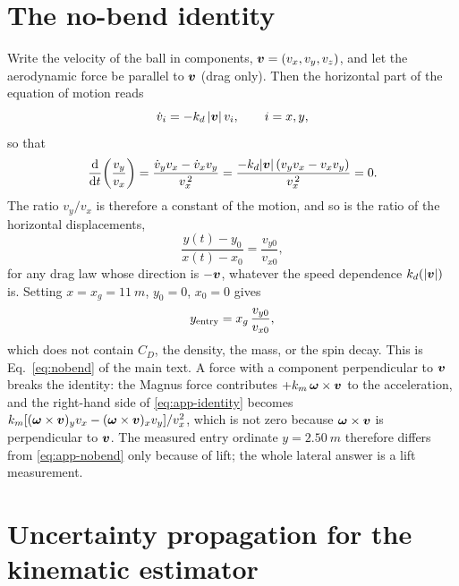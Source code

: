\appendix

\section{The no-bend identity}
\label{app:nobend}

Write the velocity of the ball in components, $\bm{v}=(v_x,v_y,v_z)$, and
let the aerodynamic force be parallel to $\bm{v}$ (drag only). Then the
horizontal part of the equation of motion reads
\begin{equation}
  \dot v_i = -k_d\,|\bm{v}|\,v_i, \qquad i=x,y ,
  \label{eq:app-drag}
\end{equation}
so that
\begin{equation}
  \frac{\mathrm{d}}{\mathrm{d} t}\!\left(\frac{v_y}{v_x}\right)
  = \frac{\dot v_y v_x - \dot v_x v_y}{v_x^{\,2}}
  = \frac{-k_d|\bm{v}|\,(v_y v_x - v_x v_y)}{v_x^{\,2}} = 0 .
  \label{eq:app-identity}
\end{equation}
The ratio $v_y/v_x$ is therefore a constant of the motion, and so is the
ratio of the horizontal displacements,
\begin{equation}
  \frac{y(t)-y_0}{x(t)-x_0} = \frac{v_{y0}}{v_{x0}} ,
  \label{eq:app-ratio}
\end{equation}
for any drag law whose direction is $-\bm{v}$, whatever the speed
dependence $k_d(|\bm{v}|)$ is. Setting $x=x_g=\SI{11}{m}$,
$y_0=0$, $x_0=0$ gives
\begin{equation}
  y_{\rm entry} = x_g\,\frac{v_{y0}}{v_{x0}} ,
  \label{eq:app-nobend}
\end{equation}
which does not contain $C_D$, the density, the mass, or the spin decay. This
is Eq.~\eqref{eq:nobend} of the main text. A force with a component
perpendicular to $\bm{v}$ breaks the identity: the Magnus force contributes
$+k_m\,\bm{\omega}\times\bm{v}$ to the acceleration, and the right-hand side
of \eqref{eq:app-identity} becomes
$k_m[(\bm{\omega}\times\bm{v})_y v_x-(\bm{\omega}\times\bm{v})_x v_y]/v_x^{2}$,
which is not zero because $\bm{\omega}\times\bm{v}$ is perpendicular to
$\bm{v}$. The measured
entry ordinate $y=\SI{2.50}{m}$ therefore differs from
\eqref{eq:app-nobend} only because of lift; the whole lateral answer is a
lift measurement.

\section{Uncertainty propagation for the kinematic estimator}
\label{app:jacobian}

